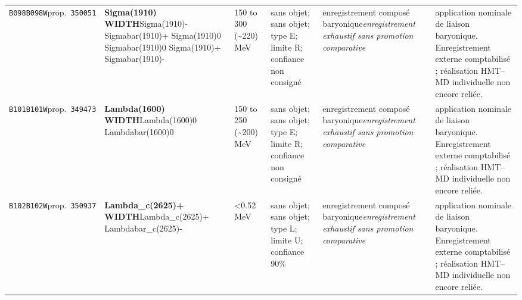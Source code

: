 \begin{landscape}
\begin{longtable}{L{1.85cm}L{4.45cm}L{2.35cm}L{4.05cm}L{3.35cm}L{7.15cm}}
\texttt{B098}\newline \texttt{B098W}\newline prop.\ \texttt{350051} & \textbf{Sigma(1910) WIDTH}\newline Sigma(1910)- \textbar{}\allowbreak{} Sigmabar(1910)+ \textbar{}\allowbreak{} Sigma(1910)0 \textbar{}\allowbreak{} Sigmabar(1910)0 \textbar{}\allowbreak{} Sigma(1910)+ \textbar{}\allowbreak{} Sigmabar(1910)- & 150 to 300 (\textasciitilde{}220)\,MeV & sans objet; sans objet; type E; limite R; confiance non consigné & enregistrement composé baryonique\newline \emph{enregistrement exhaustif sans promotion comparative} & application nominale de liaison baryonique. Enregistrement externe comptabilisé ; réalisation HMT--MD individuelle non encore reliée. \\
\texttt{B101}\newline \texttt{B101W}\newline prop.\ \texttt{349473} & \textbf{Lambda(1600) WIDTH}\newline Lambda(1600)0 \textbar{}\allowbreak{} Lambdabar(1600)0 & 150 to 250 (\textasciitilde{}200)\,MeV & sans objet; sans objet; type E; limite R; confiance non consigné & enregistrement composé baryonique\newline \emph{enregistrement exhaustif sans promotion comparative} & application nominale de liaison baryonique. Enregistrement externe comptabilisé ; réalisation HMT--MD individuelle non encore reliée. \\
\texttt{B102}\newline \texttt{B102W}\newline prop.\ \texttt{350937} & \textbf{Lambda\_\allowbreak{}c(2625)+ WIDTH}\newline Lambda\_\allowbreak{}c(2625)+ \textbar{}\allowbreak{} Lambdabar\_\allowbreak{}c(2625)- & \textless{}0.52\,MeV & sans objet; sans objet; type L; limite U; confiance 90\% & enregistrement composé baryonique\newline \emph{enregistrement exhaustif sans promotion comparative} & application nominale de liaison baryonique. Enregistrement externe comptabilisé ; réalisation HMT--MD individuelle non encore reliée. \\

\end{longtable}
\end{landscape}
